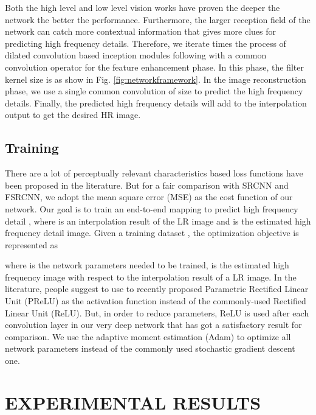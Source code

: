 \documentclass{article}
\begin{document}
Both the high level and low level vision works have proven the deeper the network the better the performance. Furthermore, the larger reception field of the network can catch more contextual information that gives more clues for predicting high frequency details. Therefore, we iterate  times the process of dilated convolution based inception modules following with a common convolution operator for the feature enhancement phase. In this phase, the filter kernel size is  as show in Fig. \ref{fig:networkframework}. In the image reconstruction phase, we use a single common convolution of size  to predict the high frequency details. Finally, the predicted high frequency details will add to the interpolation output to get the desired HR image.

\subsection{Training}
\label{subsec:training}

There are a lot of perceptually relevant characteristics based loss functions have been proposed in the literature. But for a fair comparison with SRCNN and FSRCNN, we adopt the mean square error (MSE) as the cost function of our network. Our goal is to train an end-to-end mapping  to predict high frequency detail , where  is an interpolation result of the LR image and  is the estimated high frequency detail image. Given a training dataset , the optimization objective is represented as

where  is the network parameters needed to be trained,  is the estimated high frequency image with respect to the interpolation result of a LR image. In the literature, people suggest to use to recently proposed Parametric Rectified Linear Unit (PReLU) as the activation function instead of the commonly-used Rectified Linear Unit (ReLU). But, in order to reduce parameters, ReLU is used after each convolution layer in our very deep network that has got a satisfactory result for comparison. We use the adaptive moment estimation (Adam) \cite{ref16} to optimize all network parameters instead of the commonly used stochastic gradient descent one.

\section{EXPERIMENTAL RESULTS}
\label{sec:experimental}
\end{document}

